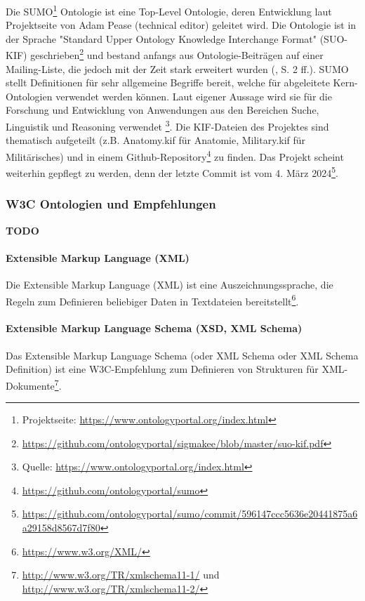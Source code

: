 \documentclass{article}
\begin{document}
Die SUMO\footnote{Projektseite: \url{https://www.ontologyportal.org/index.html}} Ontologie ist eine Top-Level Ontologie, deren Entwicklung laut Projektseite von Adam Pease (technical editor) geleitet wird.
Die Ontologie ist in der Sprache "Standard Upper Ontology Knowledge Interchange Format" (SUO-KIF) geschrieben\footnote{\url{https://github.com/ontologyportal/sigmakee/blob/master/suo-kif.pdf}} und bestand anfangs aus Ontologie-Beiträgen auf einer Mailing-Liste, die jedoch mit der Zeit stark erweitert wurden (\cite{niles2001towards}, S. 2 ff.).
SUMO stellt Definitionen für sehr allgemeine Begriffe bereit, welche für abgeleitete Kern-Ontologien verwendet werden können.
Laut eigener Aussage wird sie für die Forschung und Entwicklung von Anwendungen aus den Bereichen Suche, Linguistik und Reasoning verwendet \footnote{Quelle: \url{https://www.ontologyportal.org/index.html}}.
Die KIF-Dateien des Projektes sind thematisch aufgeteilt (z.B. Anatomy.kif für Anatomie, Military.kif für Militärisches) und in einem Github-Repository\footnote{\url{https://github.com/ontologyportal/sumo}} zu finden.
Das Projekt scheint weiterhin gepflegt zu werden, denn der letzte Commit ist vom 4. März 2024\footnote{\url{https://github.com/ontologyportal/sumo/commit/596147ccc5636e20441875a6a29158d8567d7f80}}.

\subsubsection{W3C Ontologien und Empfehlungen}

\textbf{TODO}

\paragraph{Extensible Markup Language (XML)}

Die Extensible Markup Language (XML) ist eine Auszeichnungssprache, die Regeln zum Definieren beliebiger Daten in Textdateien bereitstellt\footnote{\url{https://www.w3.org/XML/}}.

\paragraph{Extensible Markup Language Schema (XSD, XML Schema)}

Das Extensible Markup Language Schema (oder XML Schema oder XML Schema Definition) ist eine W3C-Empfehlung zum Definieren von Strukturen für XML-Dokumente\footnote{\url{http://www.w3.org/TR/xmlschema11-1/} und \url{http://www.w3.org/TR/xmlschema11-2/}}.
\end{document}
